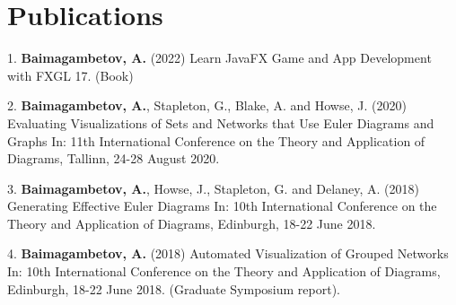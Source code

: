 \documentclass[a4paper,11pt]{article} %
\begin{document}
\begin{center}
\begin{tabular}{rl}





\end{tabular}
\end{center}



\section{Publications}

1. \textbf{Baimagambetov, A.} (2022)
Learn JavaFX Game and App Development with FXGL 17. (Book)

2. \textbf{Baimagambetov, A.}, Stapleton, G., Blake, A. and Howse, J. (2020)
Evaluating Visualizations of Sets and Networks that Use Euler Diagrams and Graphs In:
11th International Conference on the Theory and Application of Diagrams, Tallinn, 24-28 August 2020.

3. \textbf{Baimagambetov, A.}, Howse, J., Stapleton, G. and Delaney, A. (2018)
Generating Effective Euler Diagrams In:
10th International Conference on the Theory and Application of Diagrams, Edinburgh, 18-22 June 2018.

4. \textbf{Baimagambetov, A.} (2018)
Automated Visualization of Grouped Networks In:
10th International Conference on the Theory and Application of Diagrams, Edinburgh, 18-22 June 2018.
(Graduate Symposium report).
\end{document}
